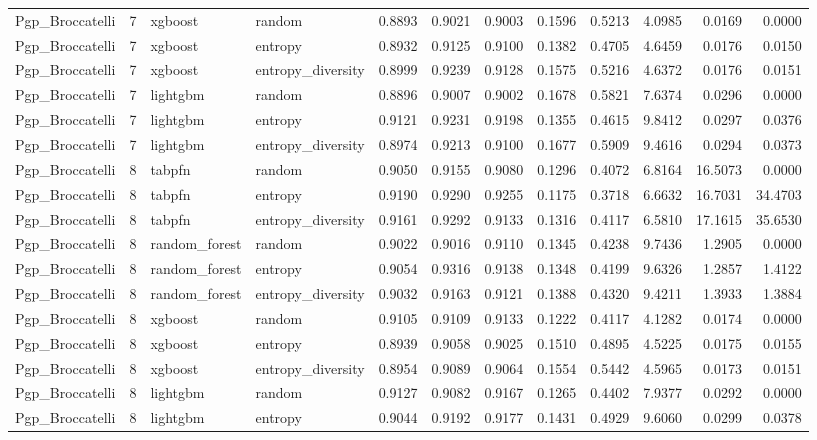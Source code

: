 \begin{tabular}{lrllrrrrrrrr}
Pgp_Broccatelli & 7 & xgboost & random & 0.8893 & 0.9021 & 0.9003 & 0.1596 & 0.5213 & 4.0985 & 0.0169 & 0.0000 \\
Pgp_Broccatelli & 7 & xgboost & entropy & 0.8932 & 0.9125 & 0.9100 & 0.1382 & 0.4705 & 4.6459 & 0.0176 & 0.0150 \\
Pgp_Broccatelli & 7 & xgboost & entropy_diversity & 0.8999 & 0.9239 & 0.9128 & 0.1575 & 0.5216 & 4.6372 & 0.0176 & 0.0151 \\
Pgp_Broccatelli & 7 & lightgbm & random & 0.8896 & 0.9007 & 0.9002 & 0.1678 & 0.5821 & 7.6374 & 0.0296 & 0.0000 \\
Pgp_Broccatelli & 7 & lightgbm & entropy & 0.9121 & 0.9231 & 0.9198 & 0.1355 & 0.4615 & 9.8412 & 0.0297 & 0.0376 \\
Pgp_Broccatelli & 7 & lightgbm & entropy_diversity & 0.8974 & 0.9213 & 0.9100 & 0.1677 & 0.5909 & 9.4616 & 0.0294 & 0.0373 \\
Pgp_Broccatelli & 8 & tabpfn & random & 0.9050 & 0.9155 & 0.9080 & 0.1296 & 0.4072 & 6.8164 & 16.5073 & 0.0000 \\
Pgp_Broccatelli & 8 & tabpfn & entropy & 0.9190 & 0.9290 & 0.9255 & 0.1175 & 0.3718 & 6.6632 & 16.7031 & 34.4703 \\
Pgp_Broccatelli & 8 & tabpfn & entropy_diversity & 0.9161 & 0.9292 & 0.9133 & 0.1316 & 0.4117 & 6.5810 & 17.1615 & 35.6530 \\
Pgp_Broccatelli & 8 & random_forest & random & 0.9022 & 0.9016 & 0.9110 & 0.1345 & 0.4238 & 9.7436 & 1.2905 & 0.0000 \\
Pgp_Broccatelli & 8 & random_forest & entropy & 0.9054 & 0.9316 & 0.9138 & 0.1348 & 0.4199 & 9.6326 & 1.2857 & 1.4122 \\
Pgp_Broccatelli & 8 & random_forest & entropy_diversity & 0.9032 & 0.9163 & 0.9121 & 0.1388 & 0.4320 & 9.4211 & 1.3933 & 1.3884 \\
Pgp_Broccatelli & 8 & xgboost & random & 0.9105 & 0.9109 & 0.9133 & 0.1222 & 0.4117 & 4.1282 & 0.0174 & 0.0000 \\
Pgp_Broccatelli & 8 & xgboost & entropy & 0.8939 & 0.9058 & 0.9025 & 0.1510 & 0.4895 & 4.5225 & 0.0175 & 0.0155 \\
Pgp_Broccatelli & 8 & xgboost & entropy_diversity & 0.8954 & 0.9089 & 0.9064 & 0.1554 & 0.5442 & 4.5965 & 0.0173 & 0.0151 \\
Pgp_Broccatelli & 8 & lightgbm & random & 0.9127 & 0.9082 & 0.9167 & 0.1265 & 0.4402 & 7.9377 & 0.0292 & 0.0000 \\
Pgp_Broccatelli & 8 & lightgbm & entropy & 0.9044 & 0.9192 & 0.9177 & 0.1431 & 0.4929 & 9.6060 & 0.0299 & 0.0378 \\

\end{tabular}
